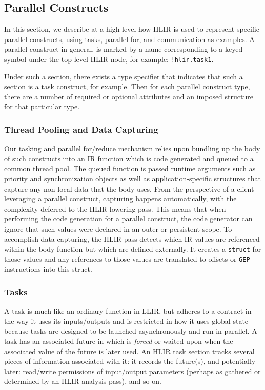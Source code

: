 \documentclass[12pt]{article}
\begin{document}
\subsection{Parallel Constructs}

In this section, we describe at a high-level how HLIR is used to represent specific parallel constructs, using tasks, parallel for, and communication as examples. A parallel construct in general, is marked by a name corresponding to a keyed symbol under the top-level HLIR node, for example: {\tt !hlir.task1}. 

Under such a section, there exists a type specifier that indicates that such a section is a task construct, for example. Then for each parallel construct type, there are a number of required or optional attributes and an imposed structure for that particular type.

\subsubsection{Thread Pooling and Data Capturing}

Our tasking and parallel for/reduce mechanism relies upon bundling up the body of such constructs into an IR function which is code generated and queued to a common thread pool. The queued function is passed runtime arguments such as priority and synchronization objects as well as application-specific structures that capture any non-local data that the body uses. From the perspective of a client leveraging a parallel construct, capturing happens automatically, with the complexity deferred to the HLIR lowering pass. This means that when performing the code generation for a parallel construct, the code generator can ignore that such values were declared in an outer or persistent scope. To accomplish data capturing, the HLIR pass detects which IR values are referenced within the body function but which are defined externally. It creates a {\tt struct} for those values and any references to those values are translated to offsets or {\tt GEP} instructions into this struct.  

\subsubsection{Tasks}

A task is much like an ordinary function in LLIR, but adheres to a contract in the way it uses its inputs/outputs and is restricted in how it uses global state because tasks are designed to be launched asynchronously and run in parallel. A task has an associated future in which is {\it forced} or waited upon when the associated value of the future is later used. An HLIR task section tracks several pieces of information associated with it: it records the future(s), and potentially later: read/write permissions of input/output parameters (perhaps as gathered or determined by an HLIR analysis pass), and so on.
\end{document}
